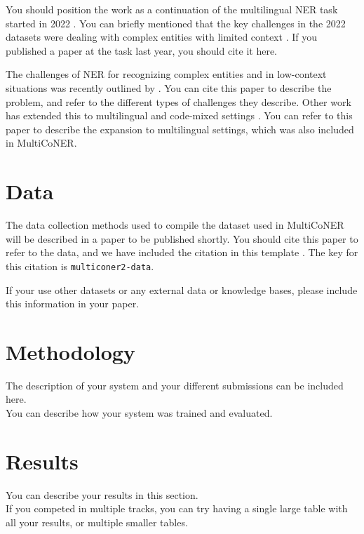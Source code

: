 \documentclass[11pt]{article}
\begin{document}
You should position the work as a continuation of the multilingual NER task started in 2022 \cite{multiconer-report}.
You can briefly mentioned that the key challenges in the 2022 datasets were dealing with complex entities with limited context \cite{multiconer-data}.
If you published a paper at the task last year, you should cite it here.

The challenges of NER for recognizing complex entities and in low-context situations was recently outlined by \citet{meng2021gemnet}. You can cite this paper to describe the problem, and refer to the different types of challenges they describe. Other work has extended this to multilingual and code-mixed settings \cite{fetahu2021gazetteer}. You can refer to this paper to describe the expansion to multilingual settings, which was also included in MultiCoNER.

\section{Data}

The data collection methods used to compile the dataset used in MultiCoNER will be described in a paper to be published shortly.
You should cite this paper to refer to the data, and we have included the citation in this template \cite{multiconer2-data}. The key for this citation is \texttt{multiconer2-data}.

If your use other datasets or any external data or knowledge bases, please include this information in your paper. 

\section{Methodology}
The description of your system and your different submissions can be included here.\\

You can describe how your system was trained and evaluated.


\section{Results}
\label{sec:results}

You can describe your results in this section. \\


If you competed in multiple tracks, you can try having a single large table with all your results, or multiple smaller tables.\\
\end{document}
